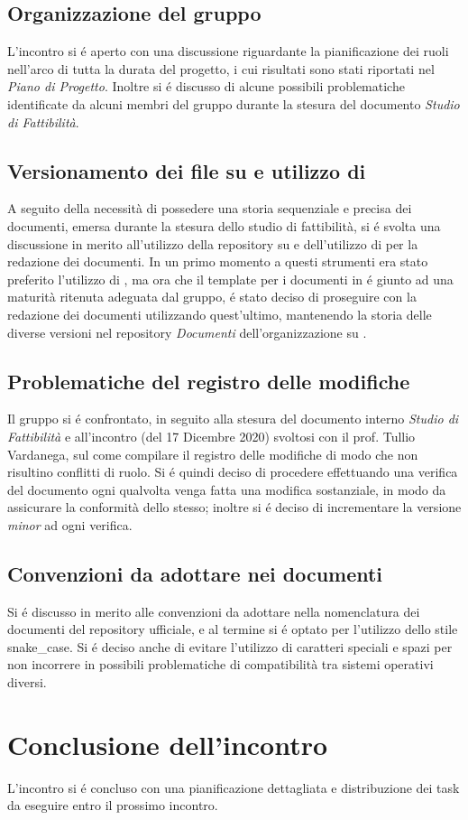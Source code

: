 \documentclass{article}
\begin{document}
	\subsection{Organizzazione del gruppo}
	\label{sub:organizzazione_gruppo}
	L'incontro si é aperto con una discussione riguardante la pianificazione dei ruoli nell'arco di tutta la durata del progetto, i cui risultati sono stati riportati nel 
	\textit{Piano di Progetto}. Inoltre si é discusso di alcune possibili problematiche identificate da alcuni membri del gruppo durante la stesura del documento 
	\textit{Studio di Fattibilità}.
	
	\subsection{Versionamento dei file su  e utilizzo di \glossario{\LaTeX}}
	\label{sub:git_latex}
	A seguito della necessità di possedere una storia sequenziale e precisa dei documenti, emersa durante la stesura dello studio di fattibilità, si é svolta una discussione in merito 
	all'utilizzo della repository su  e dell'utilizzo di \glossario{\LaTeX} per la redazione dei documenti. In un primo momento a questi strumenti era stato preferito 
	l'utilizzo di , ma ora che il template per i documenti in \glossario{\LaTeX} é giunto ad una maturità ritenuta adeguata dal gruppo, é stato deciso di 
	proseguire con la redazione dei documenti utilizzando quest'ultimo, mantenendo la storia delle diverse versioni nel repository \textit{Documenti} dell'organizzazione 
	 su .

	\subsection{Problematiche del registro delle modifiche}
	\label{sub:registro_modifiche}
	Il gruppo si é confrontato, in seguito alla stesura del documento interno \textit{Studio di Fattibilità} e all'incontro (del 17 Dicembre 2020) svoltosi con il prof. Tullio 
	Vardanega, sul come compilare il registro delle modifiche di modo che non risultino conflitti di ruolo. Si é quindi deciso di procedere effettuando una verifica del documento ogni 
	qualvolta venga fatta una modifica sostanziale, in modo da assicurare la conformità dello stesso; inoltre si é deciso di incrementare la versione \textit{minor} ad ogni verifica.

	\subsection{Convenzioni da adottare nei documenti}
	\label{sub:convenzioni}
	Si é discusso in merito alle convenzioni da adottare nella nomenclatura dei documenti del repository ufficiale, e al termine si é optato per l'utilizzo dello stile \glossario
	{snake\_case}. Si é deciso anche di evitare l'utilizzo di caratteri speciali e spazi per non incorrere in possibili problematiche di compatibilità tra sistemi operativi diversi.

\section{Conclusione dell'incontro}
\label{sec:conclusione}
L'incontro si é concluso con una pianificazione dettagliata e distribuzione dei task da eseguire entro il prossimo incontro.
\end{document}
